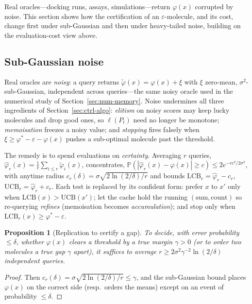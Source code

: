 \documentclass[11pt,a4paper]{article}
\newtheorem{proposition}[theorem]{Proposition}
\newcommand{\Prob}{\mathbb{P}}
\newcommand{\phist}{\varphi^*}
\begin{document}
Real oracles---docking runs, assays, simulations---return $\varphi(x)$
corrupted by noise.  This section shows how the certification of an
$\varepsilon$-molecule, and its cost, change first under sub-Gaussian and
then under heavy-tailed noise, building on the evaluation-cost view above.

\subsection{Sub-Gaussian noise}
\label{sec:ctrl-noise}

Real oracles are \emph{noisy}: a query returns
$\tilde\varphi(x)=\varphi(x)+\xi$ with $\xi$ zero-mean,
$\sigma^2$-sub-Gaussian, independent across queries---the same noisy
oracle used in the numerical study of Section~\ref{sec:num-memory}.  Noise
undermines all three ingredients of Section~\ref{sec:ctrl-algo}: \emph{elitism}
on noisy scores may keep lucky molecules and drop good ones, so
$\ell(P_t)$ need no longer be monotone; \emph{memoisation} freezes a noisy
value; and \emph{stopping} fires falsely when
$\xi\ge\phist-\varepsilon-\varphi(x)$ pushes a sub-optimal molecule past
the threshold.

The remedy is to spend evaluations on \emph{certainty}.  Averaging $r$
queries, $\widehat\varphi_r(x)=\tfrac1r\sum_{i\le r}\tilde\varphi_i(x)$,
concentrates,
$\Prob(|\widehat\varphi_r(x)-\varphi(x)|\ge c)\le2e^{-rc^2/2\sigma^2}$,
with anytime radius $c_r(\delta)=\sigma\sqrt{2\ln(2/\delta)/r}$ and bounds
$\mathrm{LCB}_r=\widehat\varphi_r-c_r$,
$\mathrm{UCB}_r=\widehat\varphi_r+c_r$.  Each test is replaced by its
confident form: prefer $x$ to $x'$ only when
$\mathrm{LCB}(x)>\mathrm{UCB}(x')$; let the cache hold the running
$(\text{sum},\text{count})$ so re-querying \emph{refines} (memoisation
becomes \emph{accumulation}); and stop only when
$\mathrm{LCB}_r(x)\ge\phist-\varepsilon$.

\begin{proposition}[Replication to certify a gap]\label{prop:rep}
  To decide, with error probability $\le\delta$, whether $\varphi(x)$
  clears a threshold by a true margin $\gamma>0$ (or to order two
  molecules a true gap $\gamma$ apart), it suffices to average
  $r\ge 2\sigma^2\gamma^{-2}\ln(2/\delta)$ independent queries.
\end{proposition}

\begin{proof}
  Then $c_r(\delta)=\sigma\sqrt{2\ln(2/\delta)/r}\le\gamma$, and the
  sub-Gaussian bound places $\varphi(x)$ on the correct side (resp.\ orders
  the means) except on an event of probability $\le\delta$.
\end{proof}
\end{document}
